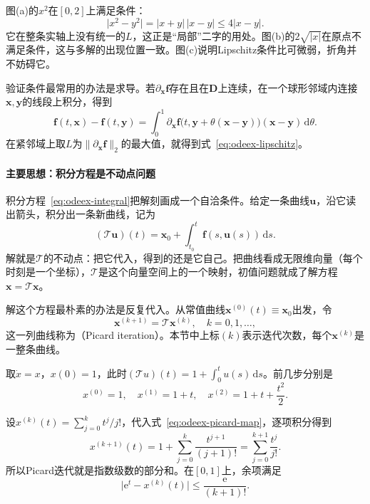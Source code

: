 图(a)的$x^2$在$[0,2]$上满足条件：
\[
 \lvert x^2-y^2\rvert=\lvert x+y\rvert\,\lvert x-y\rvert\leq4\lvert x-y\rvert.
\]
它在整条实轴上没有统一的$L$，这正是“局部”二字的用处。图(b)的$2\sqrt{\lvert x\rvert}$在原点不满足条件，这与多解的出现位置一致。图(c)说明Lipschitz条件比可微弱，折角并不妨碍它。

验证条件最常用的办法是求导。若$\partial_{\bm{x}}\bm{f}$存在且在$\bm{D}$上连续，在一个球形邻域内连接$\bm{x},\bm{y}$的线段上积分，得到
\[
 \bm{f}(t,\bm{x})-\bm{f}(t,\bm{y})
 =\int_0^1\partial_{\bm{x}}\bm{f}\bigl(t,\bm{y}+\theta(\bm{x}-\bm{y})\bigr)(\bm{x}-\bm{y})\,\mathrm{d}\theta.
\]
在紧邻域上取$L$为$\lVert\partial_{\bm{x}}\bm{f}\rVert_2$的最大值，就得到式~\eqref{eq:odeex-lipschitz}。

\paragraph{主要思想：积分方程是不动点问题}
积分方程~\eqref{eq:odeex-integral}把解刻画成一个自洽条件。给定一条曲线$\bm{u}$，沿它读出箭头，积分出一条新曲线，记为
\begin{equation}
 (\mathcal{T}\bm{u})(t)=\bm{x}_0+\int_{t_0}^{t}\bm{f}(s,\bm{u}(s))\,\mathrm{d}s.
 \label{eq:odeex-picard-map}
\end{equation}
解就是$\mathcal{T}$的不动点：把它代入，得到的还是它自己。把曲线看成无限维向量（每个时刻是一个坐标），$\mathcal{T}$是这个向量空间上的一个映射，初值问题就成了解方程$\bm{x}=\mathcal{T}\bm{x}$。

解这个方程最朴素的办法是反复代入。从常值曲线$\bm{x}^{(0)}(t)\equiv\bm{x}_0$出发，令
\begin{equation}
 \bm{x}^{(k+1)}=\mathcal{T}\bm{x}^{(k)},\quad k=0,1,\ldots,
 \label{eq:odeex-picard-iteration}
\end{equation}
这一列曲线称为（Picard iteration）。本节中上标$(k)$表示迭代次数，每个$\bm{x}^{(k)}$是一整条曲线。

\begin{example}[指数函数的Picard迭代]
\label{ex:odeex-picard-exp}
取$\dot x=x$，$x(0)=1$，此时$(\mathcal{T}u)(t)=1+\int_0^tu(s)\,\mathrm{d}s$。前几步分别是
\[
 x^{(0)}=1,\quad x^{(1)}=1+t,\quad x^{(2)}=1+t+\frac{t^2}{2}.
\]

设$x^{(k)}(t)=\sum_{j=0}^{k}t^j/j!$，代入式~\eqref{eq:odeex-picard-map}，逐项积分得到
\[
 x^{(k+1)}(t)=1+\sum_{j=0}^{k}\frac{t^{j+1}}{(j+1)!}=\sum_{j=0}^{k+1}\frac{t^j}{j!}.
\]
所以Picard迭代就是指数级数的部分和。在$[0,1]$上，余项满足
\[
 \lvert\mathrm{e}^t-x^{(k)}(t)\rvert\leq\frac{\mathrm{e}}{(k+1)!}.
\]
\end{example}

